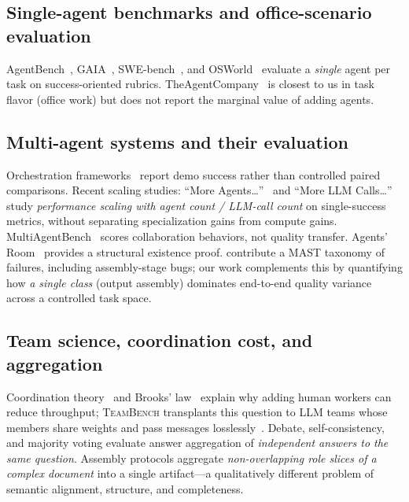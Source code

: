 \documentclass{article}
\newcommand{\teambench}{\textsc{TeamBench}}
\begin{document}
\subsection{Single-agent benchmarks and office-scenario evaluation}
AgentBench~\citep{liu2023agentbench}, GAIA~\citep{mialon2023gaia}, SWE-bench~\citep{jimenez2024swebench}, and OSWorld~\citep{xie2024osworld} evaluate a \emph{single} agent per task on success-oriented rubrics. TheAgentCompany~\citep{xu2024theagentcompany} is closest to us in task flavor (office work) but does not report the marginal value of adding agents.

\subsection{Multi-agent systems and their evaluation}
Orchestration frameworks~\citep{wu2023autogen,hong2024metagpt,crewai2024,langgraph2024,qian2024chatdev} report demo success rather than controlled paired comparisons. Recent scaling studies: ``More Agents\ldots''~\citep{li2024moreagents} and ``More LLM Calls\ldots''~\citep{chen2024morellmcalls} study \emph{performance scaling with agent count / LLM-call count} on single-success metrics, without separating specialization gains from compute gains. MultiAgentBench~\citep{zhu2025multiagentbench} scores collaboration behaviors, not quality transfer. Agents' Room~\citep{huot2025agentsroom} provides a structural existence proof. \citet{cemri2025masfail} contribute a MAST taxonomy of failures, including assembly-stage bugs; our work complements this by quantifying how \emph{a single class} (output assembly) dominates end-to-end quality variance across a controlled task space.

\subsection{Team science, coordination cost, and aggregation}
Coordination theory~\citep{malone1994interdisciplinary} and Brooks' law~\citep{brooks1995mythical} explain why adding human workers can reduce throughput; \teambench{} transplants this question to LLM teams whose members share weights and pass messages losslessly~\citep{woolley2010evidence}. Debate, self-consistency, and majority voting evaluate answer aggregation of \emph{independent answers to the same question}. Assembly protocols aggregate \emph{non-overlapping role slices of a complex document} into a single artifact---a qualitatively different problem of semantic alignment, structure, and completeness.
\end{document}
